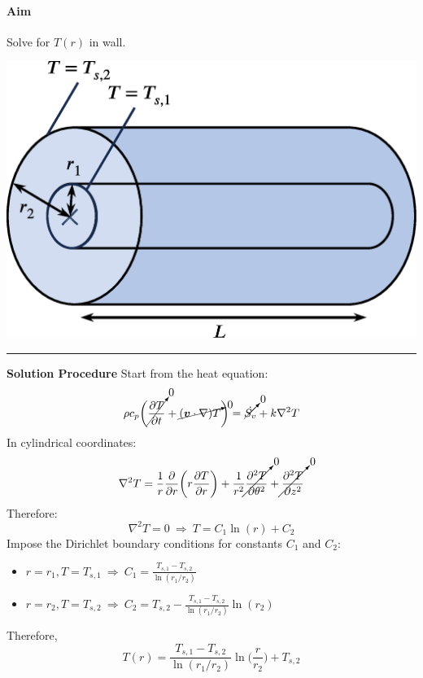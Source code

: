 \documentclass[12pt, a4paper]{article}
\begin{document}
\begin{tcolorbox}[breakable, title = \textbf{Example: Conduction Through a Cylinder}]
\begin{minipage}{.6\textwidth}
\paragraph{Aim} Solve for $T(r)$ in wall.
\end{minipage}
\hfill
\begin{minipage}{.4\textwidth}
    \includegraphics[width=\textwidth]{img/oneD_conduction_cylinder.eps}
\end{minipage}
\vspace{.2cm}
\hrule
\vspace{.2cm}
\textbf{Solution Procedure} Start from the heat equation:
\[ 
    \rho c_{p}\bigg(\cancelto{0}{\frac{\partial T}{\partial t}} +\cancelto{0}{(\bm{v} \cdot \nabla) T} \bigg) = \cancelto{0}{\dot{S_{v}}} + k\nabla^{2} T 
\]
In cylindrical coordinates:
\[ 
    \nabla^{2} T = \frac{1}{r}\frac{\partial}{\partial r} \bigg(r\frac{\partial T}{\partial r}\bigg)+ \frac{1}{r^{2}} \cancelto{0}{\frac{\partial^{2}T}{\partial \theta^{2}}}+\cancelto{0}{\frac{\partial^{2}T}{\partial z^{2}} }
\]
Therefore:
\[ 
    \nabla^{2} T = 0 \ \Rightarrow \ T=C_{1} \ln(r)+C_{2} 
\]
Impose the Dirichlet boundary conditions for constants $C_1$ and $C_2$: 
\begin{itemize}
    \item $\displaystyle r=r_{1}, T=T_{s,1} \ \Rightarrow \ C_{1}=\frac{T_{s,1}-T_{s,2}}{\ln(r_{1}/r_{2})}$
    \item $\displaystyle r=r_{2}, T=T_{s,2} \ \Rightarrow \ C_{2}=T_{s,2}-\frac{T_{s,1}-T_{s,2}}{\ln(r_{1}/r_{2})}\ln(r_{2})$
\end{itemize}
Therefore,
\[ 
    T(r) = \frac{T_{s,1}-T_{s,2}}{\ln(r_{1}/r_{2})} \ln \bigg(\frac{r}{r_{2}}\bigg) + T_{s,2} 
\]

\end{tcolorbox}
\end{document}
